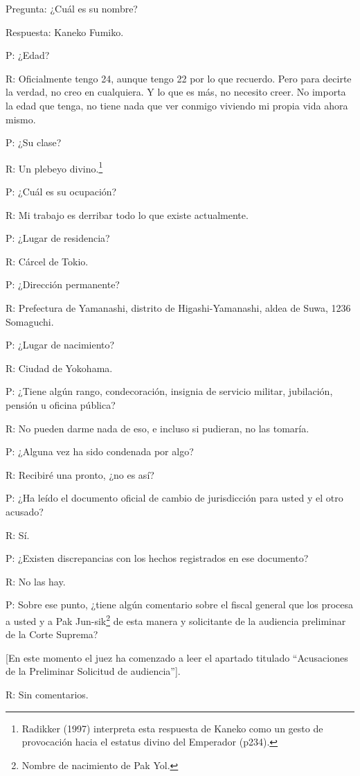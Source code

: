 \documentclass[
]{book}
\begin{document}
Pregunta: ¿Cuál es su nombre?

Respuesta: Kaneko Fumiko.

P: ¿Edad?

R: Oficialmente tengo 24, aunque tengo 22 por lo que recuerdo. Pero para decirte la verdad, no creo en cualquiera. Y lo que es más, no necesito creer. No importa la edad que tenga, no tiene nada que ver conmigo viviendo mi propia vida ahora mismo.

P: ¿Su clase?

R: Un plebeyo divino.\footnote{Radikker (1997) interpreta esta respuesta de Kaneko como un gesto de provocación hacia el estatus divino del Emperador (p234).}

P: ¿Cuál es su ocupación?

R: Mi trabajo es derribar todo lo que existe actualmente.

P: ¿Lugar de residencia?

R: Cárcel de Tokio.

P: ¿Dirección permanente?

R: Prefectura de Yamanashi, distrito de Higashi-Yamanashi, aldea de Suwa, 1236 Somaguchi.

P: ¿Lugar de nacimiento?

R: Ciudad de Yokohama.

P: ¿Tiene algún rango, condecoración, insignia de servicio militar, jubilación, pensión u oficina pública?

R: No pueden darme nada de eso, e incluso si pudieran, no las tomaría.

P: ¿Alguna vez ha sido condenada por algo?

R: Recibiré una pronto, ¿no es así?

P: ¿Ha leído el documento oficial de cambio de jurisdicción para usted y el otro acusado?

R: Sí.

P: ¿Existen discrepancias con los hechos registrados en ese documento?

R: No las hay.

P: Sobre ese punto, ¿tiene algún comentario sobre el fiscal general que los procesa a usted y a Pak Jun-sik\footnote{Nombre de nacimiento de Pak Yol.} de esta manera y solicitante de la audiencia preliminar de la Corte Suprema?

{[}En este momento el juez ha comenzado a leer el apartado titulado ``Acusaciones de la Preliminar Solicitud de audiencia''{]}.

R: Sin comentarios.
\end{document}
